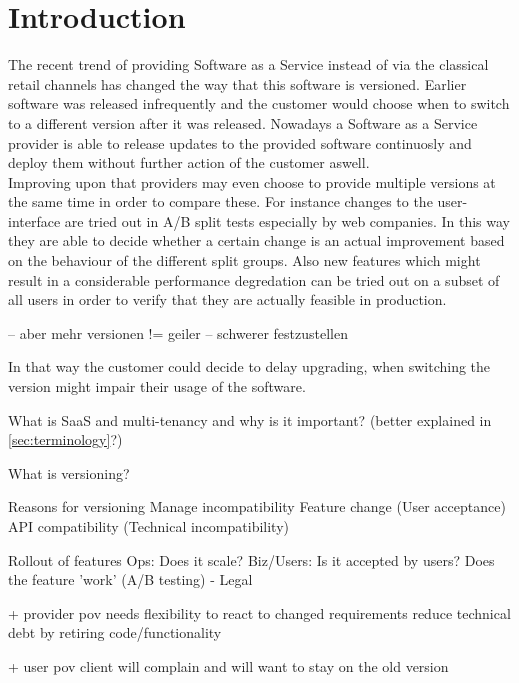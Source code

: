 \section{Introduction}

The recent trend of providing Software as a Service instead of via the classical retail channels has changed the way that this software is versioned.
Earlier software was released infrequently and the customer would choose when to switch to a different version after it was released.
Nowadays a Software as a Service provider is able to release updates to the provided software continuosly and deploy them without further action of the customer aswell.
\\
Improving upon that providers may even choose to provide multiple versions at the same time in order to compare these.
For instance changes to the user-interface are tried out in A/B split tests especially by web companies.
In this way they are able to decide whether a certain change is an actual improvement based on the behaviour of the different split groups.
Also new features which might result in a considerable performance degredation can be tried out on a subset of all users in order to verify that they are actually feasible in production.

-- aber mehr versionen != geiler
--   schwerer festzustellen



In that way the customer could decide to delay upgrading, when switching the version might impair their usage of the software.

What is SaaS and multi-tenancy and why is it important? (better explained in \ref{sec:terminology}?)

What is versioning?

Reasons for versioning
  Manage incompatibility
    Feature change (User acceptance)
    API compatibility (Technical incompatibility)

  Rollout of features
    Ops: Does it scale?
    Biz/Users: Is it accepted by users? Does the feature 'work' (A/B testing)
  - Legal

  + provider pov
  needs flexibility to react to changed requirements
  reduce technical debt by retiring code/functionality

  + user pov
  client will complain and will want to stay on the old version
